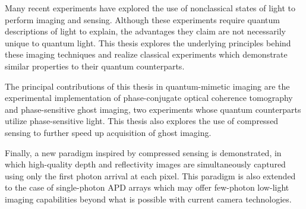 Many recent experiments have explored the use of nonclassical states
of light to perform imaging and sensing. Although these experiments
require quantum descriptions of light to explain, the advantages they
claim are not necessarily unique to quantum light. This thesis
explores the underlying principles behind these imaging techniques and
realize classical experiments which demonstrate similar properties to
their quantum counterparts.

The principal contributions of this thesis in quantum-mimetic imaging
are the experimental implementation of phase-conjugate optical
coherence tomography and phase-sensitive ghost imaging, two
experiments whose quantum counterparts utilize phase-sensitive light.
This thesis also explores the use of compressed sensing to further
speed up acquisition of ghost imaging.

Finally, a new paradigm inspired by compressed sensing is
demonstrated, in which high-quality depth and reflectivity images are
simultaneously captured using only the first photon arrival at each
pixel. This paradigm is also extended to the case of single-photon APD
arrays which may offer few-photon low-light imaging capabilities
beyond what is possible with current camera technologies.
